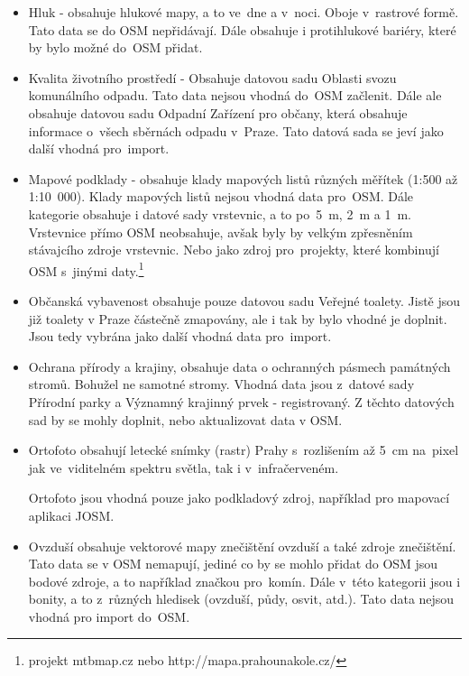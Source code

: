 \begin{itemize}
    \item   Hluk - obsahuje hlukové mapy, a to ve~dne a v~noci. Oboje
            v~rastrové formě. Tato data se do OSM nepřidávají. Dále
            obsahuje i protihlukové bariéry, které by bylo možné
            do~OSM přidat.

    \item   Kvalita životního prostředí - Obsahuje datovou sadu
            Oblasti svozu komunálního odpadu. Tato data nejsou vhodná
            do~OSM začlenit. Dále ale obsahuje datovou sadu
            Odpadní Zařízení pro občany, která obsahuje informace
            o~všech sběrnách odpadu v~Praze. Tato datová sada se jeví
            jako další vhodná pro~import.

    \item   Mapové podklady - obsahuje klady mapových listů různých
            měřítek (1:500 až 1:10~000). Klady mapových listů nejsou
            vhodná data pro~OSM. Dále kategorie obsahuje i datové sady
            vrstevnic, a to po~5~m, 2~m a 1~m. Vrstevnice přímo OSM
            neobsahuje, avšak byly by velkým zpřesněním stávajcího
            zdroje vrstevnic. Nebo jako zdroj pro~projekty, které
            kombinují OSM s~jinými daty.\footnote{projekt mtbmap.cz nebo http://mapa.prahounakole.cz/}

    \item   Občanská vybavenost obsahuje pouze datovou sadu Veřejné
            toalety. Jistě jsou již toalety v Praze částečně
            zmapovány, ale i tak by bylo vhodné je doplnit. Jsou tedy
            vybrána jako další vhodná data pro~import.

    \item   Ochrana přírody a krajiny, obsahuje data o ochranných
            pásmech památných stromů. Bohužel ne samotné stromy.
            Vhodná data jsou z~datové sady Přírodní parky a
            Významný krajinný prvek - registrovaný. Z těchto datových
            sad by se mohly doplnit, nebo aktualizovat data v OSM.

    \item   Ortofoto obsahují letecké snímky (rastr) Prahy 
            s~rozlišením až 5~cm na~pixel jak ve~viditelném spektru
            světla, tak i v~infračerveném.

            Ortofoto jsou vhodná pouze jako podkladový zdroj,
            například pro mapovací aplikaci JOSM.

    \item   Ovzduší obsahuje vektorové mapy znečištění ovzduší a také
            zdroje znečištění. Tato data se v OSM nemapují, jediné co
            by se mohlo přidat do OSM jsou bodové zdroje, a to
            například značkou pro~komín. Dále v~této kategorii jsou i
            bonity, a to z~různých hledisek (ovzduší, půdy,
            osvit, atd.). Tato data nejsou vhodná pro import do~OSM.


\end{itemize}
